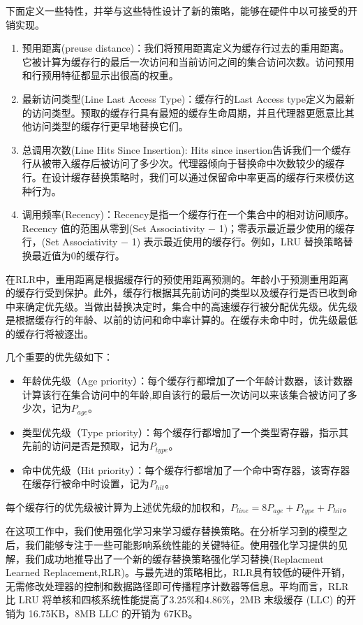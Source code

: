 \documentclass[10pt,journal,compsoc]{IEEEtran}
\begin{document}
下面定义一些特性，并举与这些特性设计了新的策略，能够在硬件中以可接受的开销实现。
\begin{enumerate}
\item 预用距离(preuse distance)：我们将预用距离定义为缓存行过去的重用距离。它被计算为缓存行的最后一次访问和当前访问之间的集合访问次数。访问预用和行预用特征都显示出很高的权重。
\item 最新访问类型(Line Last Access Type)：缓存行的Last Access type定义为最新的访问类型。预取的缓存行具有最短的缓存生命周期，并且代理器更愿意比其他访问类型的缓存行更早地替换它们。
\item 总调用次数(Line Hits Since Insertion): Hits since insertion告诉我们一个缓存行从被带入缓存后被访问了多少次。代理器倾向于替换命中次数较少的缓存行。在设计缓存替换策略时，我们可以通过保留命中率更高的缓存行来模仿这种行为。
\item 调用频率(Recency)：Recency是指一个缓存行在一个集合中的相对访问顺序。 Recency 值的范围从零到(Set Associativity − 1)；零表示最近最少使用的缓存行，(Set Associativity − 1) 表示最近使用的缓存行。例如，LRU 替换策略替换最近值为0的缓存行。
\end{enumerate}

在RLR\cite{sethumurugan2021designing}中，重用距离是根据缓存行的预使用距离预测的。年龄小于预测重用距离的缓存行受到保护。此外，缓存行根据其先前访问的类型以及缓存行是否已收到命中来确定优先级。当做出替换决定时，集合中的高速缓存行被分配优先级。优先级是根据缓存行的年龄、以前的访问和命中率计算的。在缓存未命中时，优先级最低的缓存行将被逐出。

几个重要的优先级如下：
\begin{itemize}
\item 年龄优先级（Age priority）：每个缓存行都增加了一个年龄计数器，该计数器计算该行在集合访问中的年龄,即自该行的最后一次访问以来该集合被访问了多少次，记为$P_{age}$。
\item 类型优先级（Type priority）：每个缓存行都增加了一个类型寄存器，指示其先前的访问是否是预取，记为$P_{type}$。
\item 命中优先级（Hit priority）：每个缓存行都增加了一个命中寄存器，该寄存器在缓存行被命中时设置，记为$P_{hit}$。

\end{itemize}

每个缓存行的优先级被计算为上述优先级的加权和，$P_{line} = 8 P_{age} + P_{type} + P_{hit}$。

在这项工作中，我们使用强化学习来学习缓存替换策略。在分析学习到的模型之后，我们能够专注于一些可能影响系统性能的关键特征。使用强化学习提供的见解，我们成功地推导出了一个新的缓存替换策略强化学习替换(Replacment Learned Replacement,RLR)。与最先进的策略相比，RLR具有较低的硬件开销，无需修改处理器的控制和数据路径即可传播程序计数器等信息。平均而言，RLR 比 LRU 将单核和四核系统性能提高了$3.25\%$和$4.86\%$，2MB 末级缓存 (LLC) 的开销为 16.75KB，8MB LLC 的开销为 67KB。
\end{document}

